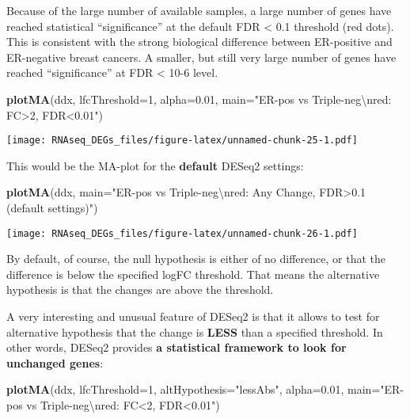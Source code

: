 \documentclass[]{book}
\newenvironment{Shaded}{\begin{snugshade}}{\end{snugshade}}
\newcommand{\KeywordTok}[1]{\textcolor[rgb]{0.13,0.29,0.53}{\textbf{#1}}}
\newcommand{\DataTypeTok}[1]{\textcolor[rgb]{0.13,0.29,0.53}{#1}}
\newcommand{\DecValTok}[1]{\textcolor[rgb]{0.00,0.00,0.81}{#1}}
\newcommand{\FloatTok}[1]{\textcolor[rgb]{0.00,0.00,0.81}{#1}}
\newcommand{\CharTok}[1]{\textcolor[rgb]{0.31,0.60,0.02}{#1}}
\newcommand{\StringTok}[1]{\textcolor[rgb]{0.31,0.60,0.02}{#1}}
\newcommand{\NormalTok}[1]{#1}
\begin{document}
Because of the large number of available samples, a large number of
genes have reached statistical ``significance'' at the default FDR
\textless{} 0.1 threshold (red dots). This is consistent with the strong
biological difference between ER-positive and ER-negative breast
cancers. A smaller, but still very large number of genes have reached
``significance'' at FDR \textless{} 10-6 level.

\begin{Shaded}
\begin{Highlighting}[]
\KeywordTok{plotMA}\NormalTok{(ddx, }\DataTypeTok{lfcThreshold=}\DecValTok{1}\NormalTok{, }\DataTypeTok{alpha=}\FloatTok{0.01}\NormalTok{, }\DataTypeTok{main=}\StringTok{"ER-pos vs Triple-neg}\CharTok{\textbackslash{}n}\StringTok{red: FC>2, FDR<0.01"}\NormalTok{)}
\end{Highlighting}
\end{Shaded}

\texttt{[image: RNAseq\_DEGs\_files/figure-latex/unnamed-chunk-25-1.pdf]}

This would be the MA-plot for the \textbf{default} DESeq2 settings:

\begin{Shaded}
\begin{Highlighting}[]
\KeywordTok{plotMA}\NormalTok{(ddx, }\DataTypeTok{main=}\StringTok{"ER-pos vs Triple-neg}\CharTok{\textbackslash{}n}\StringTok{red: Any Change, FDR>0.1 (default settings)"}\NormalTok{)}
\end{Highlighting}
\end{Shaded}

\texttt{[image: RNAseq\_DEGs\_files/figure-latex/unnamed-chunk-26-1.pdf]}

By default, of course, the null hypothesis is either of no difference,
or that the difference is below the specified logFC threshold. That
means the alternative hypothesis is that the changes are above the
threshold.

A very interesting and unusual feature of DESeq2 is that it allows to
test for alternative hypothesis that the change is \textbf{LESS} than a
specified threshold. In other words, DESeq2 provides \textbf{a
statistical framework to look for unchanged genes}:

\begin{Shaded}
\begin{Highlighting}[]
\KeywordTok{plotMA}\NormalTok{(ddx, }\DataTypeTok{lfcThreshold=}\DecValTok{1}\NormalTok{, }\DataTypeTok{altHypothesis=}\StringTok{"lessAbs"}\NormalTok{, }\DataTypeTok{alpha=}\FloatTok{0.01}\NormalTok{, }
       \DataTypeTok{main=}\StringTok{"ER-pos vs Triple-neg}\CharTok{\textbackslash{}n}\StringTok{red: FC<2, FDR<0.01"}\NormalTok{)}
\end{Highlighting}
\end{Shaded}
\end{document}

